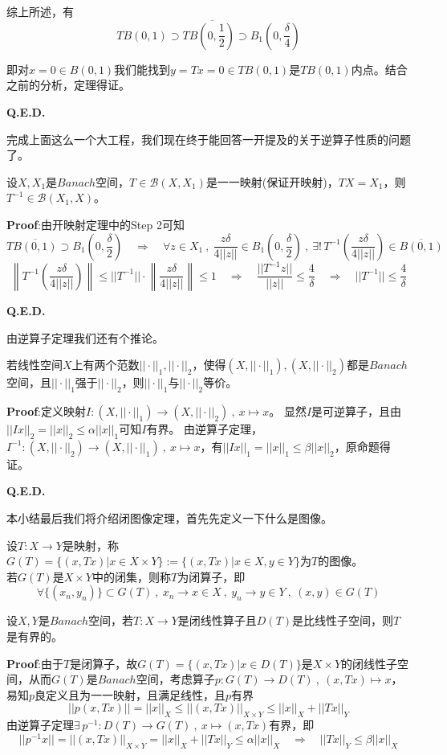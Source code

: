 综上所述，有
\[TB(0,1) \supset T\overline{B(0,\frac{1}{2})} \supset B_1(0,\frac{\delta}{4})\]

即对$x=0 \in B(0,1)$我们能找到$y=Tx=0 \in TB(0,1)$是$TB(0,1)$内点。结合之前的分析，定理得证。

\textbf{Q.E.D.}

完成上面这么一个大工程，我们现在终于能回答一开提及的关于逆算子性质的问题了。
\begin{theorem}[逆算子定理]
    设$X,X_1$是$Banach$空间，$T \in \mathscr{B}(X,X_1)$是一一映射(保证开映射)，$TX=X_1$，则$T^{-1} \in \mathscr{B}(X_1,X)$。
\end{theorem} 
\textbf{Proof}:由开映射定理中的Step 2可知
\[T\overline{B(0,1)} \supset B_1(0,\frac{\delta}{2}) \quad \Rightarrow \quad \forall z \in X_1 \ , \  \frac{z\delta}{4||z||} \in B_1(0,\frac{\delta}{2}) \ , \ \exists ! \, T^{-1}\left(\frac{z\delta}{4||z||}\right) \in \overline{B(0,1)}\]
\[\left\|T^{-1}\left(\frac{z\delta}{4||z||}\right)\right\| \leq ||T^{-1}|| \cdot \left\|\frac{z\delta}{4||z||}\right\| \leq 1 \quad \Rightarrow \quad \frac{||T^{-1}z||}{||z||} \leq \frac{4}{\delta} \quad \Rightarrow \quad ||T^{-1}|| \leq \frac{4}{\delta}\]

\textbf{Q.E.D.}

由逆算子定理我们还有个推论。
\begin{proposition}
    若线性空间$X$上有两个范数$||\cdot||_1,||\cdot||_2$，使得$(X,||\cdot||_1),(X,||\cdot||_2)$都是$Banach$空间，且$||\cdot||_1$强于$||\cdot||_2$，则$||\cdot||_1$与$||\cdot||_2$等价。
\end{proposition}
\textbf{Proof}:定义映射$I:(X,||\cdot||_1) \to (X,||\cdot||_2) \ , \ x \mapsto x$。
显然$I$是可逆算子，且由$||Ix||_2=||x||_2 \leq \alpha ||x||_1$可知$I$有界。
由逆算子定理，$I^{-1}:(X,||\cdot||_2) \to (X,||\cdot||_1) \ , \ x \mapsto x$，有$||Ix||_1=||x||_1 \leq \beta ||x||_2$，原命题得证。

\textbf{Q.E.D.}

本小结最后我们将介绍闭图像定理，首先先定义一下什么是图像。
\begin{definition}[图像，闭图像]
    设$T:X \to Y$是映射，称$G(T)=\{(x,Tx)|x \in X \times Y\}:=\{(x,Tx)|x \in X ,y \in Y\}$为$T$的图像。\\
    若$G(T)$是$X \times Y$中的闭集，则称$T$为闭算子，即
    \[\forall \{(x_n,y_n)\} \subset G(T) \ , \ x_n \to x \in X \ , \ y_n \to y \in Y \ , \ (x,y) \in G(T)\]
\end{definition}
\begin{theorem}[闭图像定理]
    设$X,Y$是$Banach$空间，若$T:X \to Y$是闭线性算子且$D(T)$是比线性子空间，则$T$是有界的。
\end{theorem} 
\textbf{Proof}:由于$T$是闭算子，故$G(T)=\{(x,Tx)|x \in D(T)\}$是$X \times Y$的闭线性子空间，从而$G(T)$是$Banach$空间，考虑算子$p:G(T) \to D(T) \ , \ (x,Tx) \mapsto x$，易知$p$良定义且为一一映射，且满足线性，且$p$有界
\[||p(x,Tx)||=||x||_X \leq ||(x,Tx)||_{X \times Y} \leq ||x||_X + ||Tx||_Y\]
由逆算子定理$\exists \, p^{-1}:D(T) \to G(T) \ , \ x \mapsto (x,Tx)$有界，即
\[||p^{-1}x||=||(x,Tx)||_{X \times Y}=||x||_X + ||Tx||_Y \leq \alpha ||x||_X \quad \Rightarrow \quad ||Tx||_Y \leq \beta ||x||_X\]

